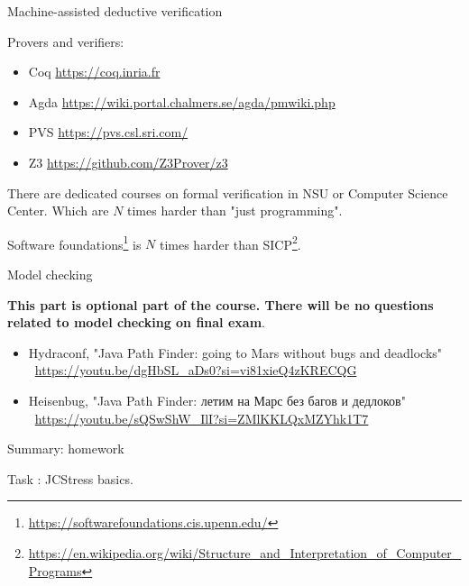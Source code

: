 \begin{frame}{Machine-assisted deductive verification}

Provers and verifiers:
\begin{itemize}
  \item Coq \url{https://coq.inria.fr}
  \item Agda \url{https://wiki.portal.chalmers.se/agda/pmwiki.php}
  \item PVS \url{https://pvs.csl.sri.com/}
  \item Z3 \url{https://github.com/Z3Prover/z3}
\end{itemize}

\pause

There are dedicated courses on formal verification in NSU or Computer Science Center. Which are $N$ times harder than "just programming".

\pause

Software foundations\footnote<3->{\tiny\url{https://softwarefoundations.cis.upenn.edu/}} is $N$ times harder than SICP\footnote<3->{\tiny\url{https://en.wikipedia.org/wiki/Structure_and_Interpretation_of_Computer_Programs}}.

\end{frame}


\begin{frame}{Model checking}

\textbf{This part is optional part of the course. There will be no questions related to model checking on final exam}.

\pause

\begin{itemize}
  \item Hydraconf, "Java Path Finder: going to Mars without bugs and deadlocks" \ \url{https://youtu.be/dgHbSL_aDs0?si=vi81xieQ4zKRECQG}
  \item Heisenbug, "Java Path Finder: летим на Марс без багов и дедлоков" \ \url{https://youtu.be/sQSwShW_IlI?si=ZMlKKLQxMZYhk1T7}
\end{itemize}

\end{frame}


\begin{frame}{Summary: homework}

Task \taskJCStress: JCStress basics.

\end{frame}




